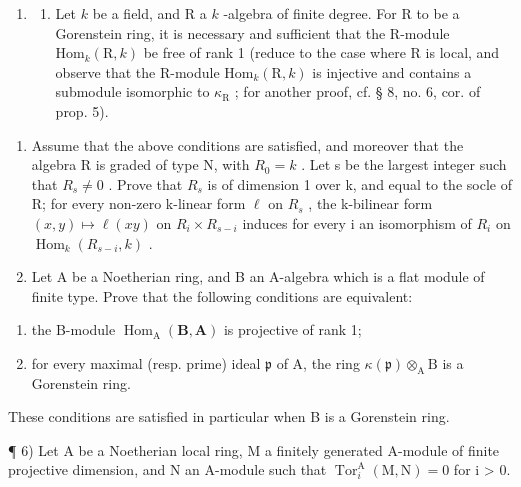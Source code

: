 \begin{enumerate}
\def\labelenumi{\arabic{enumi})}
\setcounter{enumi}{4}
\tightlist
\item
  \begin{enumerate}
  \def\labelenumii{\alph{enumii})}
  \tightlist
  \item
    Let \(k\) be a field, and R a \(k\) -algebra of finite degree. For R to be a Gorenstein ring, it is necessary and sufficient that the R-module \(\mathrm{Hom}_{k}(\mathrm{R}, k)\) be free of rank 1 (reduce to the case where R is local, and observe that the R-module \(\mathrm{Hom}_{k}(\mathrm{R}, k)\) is injective and contains a submodule isomorphic to \(\kappa_{\mathrm{R}}\) ; for another proof, cf. § 8, no. 6, cor. of prop. 5).
  \end{enumerate}
\end{enumerate}

\begin{enumerate}
\def\labelenumi{\alph{enumi})}
\setcounter{enumi}{1}
\item
  Assume that the above conditions are satisfied, and moreover that the algebra R is graded of type N, with \(R_{0} = k\) . Let s be the largest integer such that \(R_{s} \neq 0\) . Prove that \(R_{s}\) is of dimension 1 over k, and equal to the socle of R; for every non-zero k-linear form \(\ell\) on \(R_{s}\) , the k-bilinear form \((x, y) \mapsto \ell(xy)\) on \(R_{i} \times R_{s- i}\) induces for every i an isomorphism of \(R_{i}\) on \(\operatorname{Hom}_{k}(R_{s-i}, k)\) .
\item
  Let A be a Noetherian ring, and B an A-algebra which is a flat module of finite type. Prove that the following conditions are equivalent:
\end{enumerate}

\begin{enumerate}
\def\labelenumi{(\roman{enumi})}
\item
  the B-module \(\operatorname{Hom}_{\mathrm{A}}(\mathbf{B},\mathbf{A})\) is projective of rank 1;
\item
  for every maximal (resp. prime) ideal \(\mathfrak{p}\) of A, the ring \(\kappa(\mathfrak{p})\otimes_{\mathrm{A}}\mathrm{B}\) is a Gorenstein ring.
\end{enumerate}

These conditions are satisfied in particular when B is a Gorenstein ring.

¶ 6) Let A be a Noetherian local ring, M a finitely generated A-module of finite projective dimension, and N an A-module such that \(\operatorname{Tor}_{i}^{\mathrm{A}}(\mathrm{M},\mathrm{N}) = 0\) for i \textgreater{} 0.

